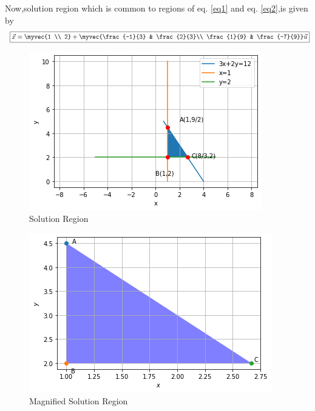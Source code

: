 \documentclass[journal,12pt,twocolumn]{IEEEtran}
\begin{document}
Now,solution region which is common to regions of eq. \eqref{eq1} and eq. \eqref{eq2},is given by
\begin{align}
    \boxed{\vec{x} = \myvec{1 \\ 2}+\myvec{\frac{-1}{3} & \frac {2}{3}\\ \frac{1}{9} & \frac{-7}{9}}\vec{u}}
\end{align}
\begin{figure}[!ht]
\centering
\includegraphics[width=\columnwidth]{Figure8(1)}
\caption{Solution Region}
\label{fig:fig1}	
\end{figure}
\begin{figure}[!ht]
\centering
\includegraphics[width=\columnwidth]{Figure8(2)}
\caption{Magnified Solution Region}
\label{fig:fig2}	
\end{figure}
\end{document}

